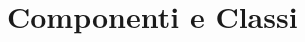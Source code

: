 %
%


\section{Componenti e Classi} %
\label{sec:componenti_e_classi}
	 \clearpage \newpage
	 \clearpage \newpage
	 \clearpage \newpage
